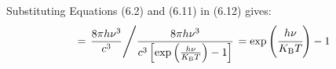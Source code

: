 Substituting Equations (6.2) and (6.11) in (6.12) gives:
$$
	=\left. \frac{8 \pi h \nu^3}{c^3} \middle/ \frac{8 \pi h \nu^3}{c^3\left[\exp \left(\frac{h \nu}{K_{\mathrm{B}} T}\right)-1\right]}\right. =\exp \left(\cfrac{h \nu}{K_{\mathrm{B}} T}\right)-1
$$




